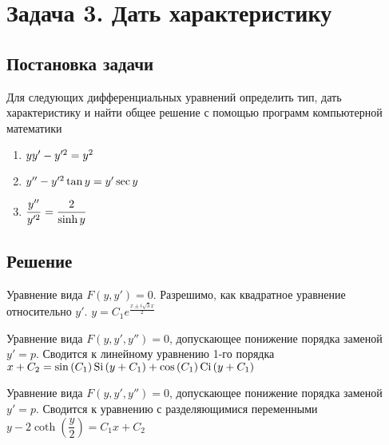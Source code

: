 

\section{Задача 3. Дать характеристику}
\subsection{Постановка задачи}
Для следующих дифференциальных уравнений определить тип, дать характеристику 
и найти общее решение с помощью программ компьютерной математики

\begin{enumerate}
	\item $ yy'-y'^2=y^2 $
	\item $ y''-y'^2\tan{y}=y'\sec{y} $
	\item $ \dfrac{y''}{y'^2}=\dfrac{2}{\sinh{y}} $
\end{enumerate}

\newpage

\subsection{Решение}
\begin{enumerate}
	\solutionItemThird
		{\equationFirst}
		{
			Уравнение вида $ F(y, y') = 0 $.
		}
		{Разрешимо, как квадратное уравнение относительно $ y' $.}
		{$ y = C_1e^{\tfrac{x \pm i\sqrt{3}x}{2}} $}
	
	\vspace{1.5em}

	\solutionItemThird
		{\equationSecond}
		{
			Уравнение вида $ F(y, y', y'') = 0 $, допускающее 
			понижение порядка заменой $ y' = p $. 
		}
		{Сводится к линейному уравнению 1-го порядка}
		{$ x + C_2 = \sin{(C_1)} \operatorname{Si}{(y + C_1)} + \cos{(C_1)} \operatorname{Ci}{(y + C_1)} $}
		
	\vspace{1.5em}	
		
	\solutionItemThird
		{\equationThird}
		{ 
			Уравнение вида $ F(y, y', y'') = 0 $, допускающее
			понижение порядка заменой $ y' = p $.
		}
		{Сводится к уравнению с разделяющимися переменными}
		{$ y - 2\coth{\left(\dfrac{y}{2}\right)} = C_1x + C_2 $}
\end{enumerate}
